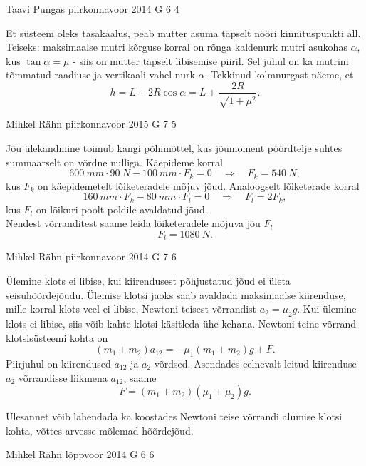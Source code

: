 \documentclass[11pt]{article}
\begin{document}
{%
{Taavi Pungas} %
{piirkonnavoor} %
{2014} %
{G 6} %
{4} %
{

\ifSolution
Et süsteem oleks tasakaalus, peab mutter asuma täpselt nööri kinnituspunkti all. Teiseks: maksimaalse mutri kõrguse korral on rõnga kaldenurk mutri asukohas $\alpha$, kus $\tan \alpha = \mu$ - siis on mutter täpselt libisemise piiril. Sel juhul on ka mutrini tõmmatud raadiuse ja vertikaali vahel nurk $\alpha$. Tekkinud kolmnurgast näeme, et
\[
h=L+2R\cos \alpha = L+ \frac{2R}{\sqrt{1+\mu^2}}.
\]
\fi
}

{Mihkel Rähn} %
{piirkonnavoor} %
{2015} %
{G 7} %
{5} %
{

\ifSolution
Jõu ülekandmine toimub kangi põhimõttel, kus jõumoment pöördtelje suhtes summaarselt on võrdne nulliga. Käepideme korral
\[ \SI{600}{mm}\cdot\SI{90}{N}-\SI{100}{mm}\cdot F_k = 0 \quad\Rightarrow\quad F_k = \SI{540}{N}, \]
kus $F_k$ on käepidemetelt lõiketeradele mõjuv jõud. Analoogselt lõiketerade korral
\[ \SI{160}{mm}\cdot F_k - \SI{80}{mm}\cdot F_l = 0 \quad\Rightarrow\quad F_l = 2F_k, \]
kus $F_l$ on lõikuri poolt poldile avaldatud jõud.\\
Nendest võrranditest saame leida lõiketeradele mõjuva jõu $F_l$
\[ F_l = \SI{1080}{N}.\]
\fi
}

{Mihkel Rähn} %
{piirkonnavoor} %
{2014} %
{G 7} %
{6} %
{

\ifSolution
Ülemine klots ei libise, kui kiirendusest põhjustatud jõud ei ületa seisuhõõrdejõudu. Ülemise klotsi jaoks saab avaldada maksimaalse kiirenduse, mille korral klots veel ei libise, Newtoni teisest võrrandist $a_2=\mu_2g$. Kui ülemine klots ei libise, siis võib kahte klotsi käsitleda ühe kehana. Newtoni teine võrrand klotsisüsteemi kohta on 
\[
(m_1+m_2)a_{12} = -\mu_1 (m_1+m_2)g+F.
\]
Piirjuhul on kiirendused $a_{12}$ ja $a_2$ võrdsed. Asendades eelnevalt leitud kiirenduse $a_2$ võrrandisse liikmena $a_{12}$, saame
\[
F=(m_1+m_2)(\mu_1+\mu_2)g.
\]


Ülesannet võib lahendada ka koostades Newtoni teise võrrandi alumise klotsi kohta, võttes arvesse mõlemad hõõrdejõud. 
\fi
}

{Mihkel Rähn} %
{lõppvoor} %
{2014} %
{G 6} %
{6} %
{

}}
\end{document}
